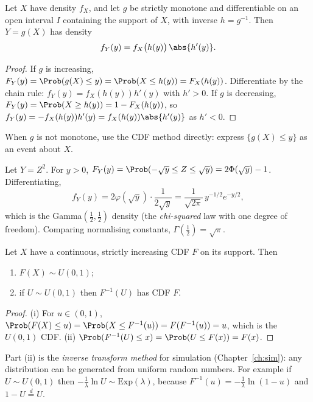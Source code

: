 \begin{theorem}\label{thm:changevar}
Let $X$ have density $f_X$, and let $g$ be strictly monotone and differentiable on
an open interval $I$ containing the support of $X$, with inverse $h=g^{-1}$. Then
$Y=g(X)$ has density
\[
f_Y(y)=f_X\bigl(h(y)\bigr)\,\abs{h'(y)}.
\]
\end{theorem}
\begin{proof}
If $g$ is increasing, $F_Y(y)=\Prob(g(X)\le y)=\Prob(X\le h(y))=F_X(h(y))$. Differentiate
by the chain rule: $f_Y(y)=f_X(h(y))h'(y)$ with $h'>0$. If $g$ is decreasing,
$F_Y(y)=\Prob(X\ge h(y))=1-F_X(h(y))$, so $f_Y(y)=-f_X(h(y))h'(y)=f_X(h(y))\abs{h'(y)}$
as $h'<0$.
\end{proof}

When $g$ is not monotone, use the CDF method directly: express $\{g(X)\le y\}$ as
an event about $X$.

\begin{example}
Let $Y=Z^2$. For $y>0$, $F_Y(y)=\Prob(-\sqrt y\le Z\le\sqrt y)=2\Phi(\sqrt y)-1$. Differentiating,
\[
f_Y(y)=2\varphi(\sqrt y)\cdot\frac1{2\sqrt y}=\frac1{\sqrt{2\pi}}\,y^{-1/2}e^{-y/2},
\]
which is the Gamma$(\tfrac12,\tfrac12)$ density (the \emph{chi-squared} law with one
degree of freedom). Comparing normalising constants,
$\Gamma(\tfrac12)=\sqrt\pi$.
\end{example}

\begin{theorem}\label{thm:pit}
Let $X$ have a continuous, strictly increasing CDF $F$ on its support. Then
\begin{enumerate}[label=(\roman*)]
\item $F(X)\sim U(0,1)$;
\item if $U\sim U(0,1)$ then $F^{-1}(U)$ has CDF $F$.
\end{enumerate}
\end{theorem}
\begin{proof}
(i) For $u\in(0,1)$, $\Prob(F(X)\le u)=\Prob(X\le F^{-1}(u))=F(F^{-1}(u))=u$, which is
the $U(0,1)$ CDF. (ii) $\Prob(F^{-1}(U)\le x)=\Prob(U\le F(x))=F(x)$.
\end{proof}

Part (ii) is the \emph{inverse transform method} for simulation
(Chapter~\ref{ch:sim}): any distribution can be generated from uniform random
numbers. For example if $U\sim U(0,1)$ then $-\frac1\lambda\ln U\sim\mathrm{Exp}(\lambda)$,
because $F^{-1}(u)=-\frac1\lambda\ln(1-u)$ and $1-U\overset d=U$.

